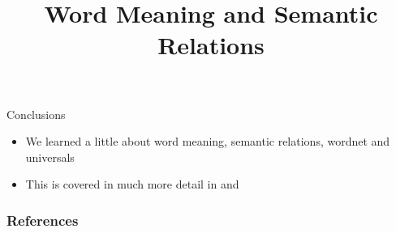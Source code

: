 \documentclass{beamer}
\title[Word Meaning]{Word Meaning and Semantic Relations}
\begin{document}
\maketitle


%




%
%

 

\begin{frame}{Conclusions}

\begin{itemize}
\item We learned a little about word meaning, semantic relations, wordnet and universals
\item This is covered in much more detail in \citet[Chapter 3]{Saeed:2015}  and \citet[Chapter~6 and~7]{Kroeger:2022}
\end{itemize}
\end{frame}



\begin{frame}[allowframebreaks]
  \frametitle{References}
  
  
\end{frame}


\end{document}
